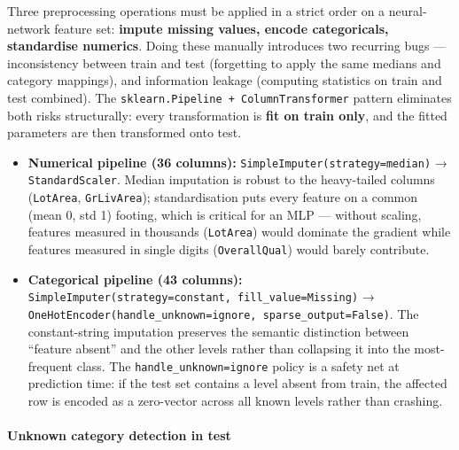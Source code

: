 Three preprocessing operations must be applied in a strict order on a
neural-network feature set: \textbf{impute missing values, encode
categoricals, standardise numerics}. Doing these manually introduces two
recurring bugs --- inconsistency between train and test (forgetting to
apply the same medians and category mappings), and information leakage
(computing statistics on train and test combined). The
\texttt{sklearn.Pipeline\ +\ ColumnTransformer} pattern eliminates both
risks structurally: every transformation is \textbf{fit on train only},
and the fitted parameters are then transformed onto test.

\begin{itemize}
\tightlist
\item
  \textbf{Numerical pipeline (36 columns):}
  \texttt{SimpleImputer(strategy=\textquotesingle{}median\textquotesingle{})}
  → \texttt{StandardScaler}. Median imputation is robust to the
  heavy-tailed columns (\texttt{LotArea}, \texttt{GrLivArea});
  standardisation puts every feature on a common (mean 0, std 1)
  footing, which is critical for an MLP --- without scaling, features
  measured in thousands (\texttt{LotArea}) would dominate the gradient
  while features measured in single digits (\texttt{OverallQual}) would
  barely contribute.
\item
  \textbf{Categorical pipeline (43 columns):}
  \texttt{SimpleImputer(strategy=\textquotesingle{}constant\textquotesingle{},\ fill\_value=\textquotesingle{}Missing\textquotesingle{})}
  →
  \texttt{OneHotEncoder(handle\_unknown=\textquotesingle{}ignore\textquotesingle{},\ sparse\_output=False)}.
  The constant-string imputation preserves the semantic distinction
  between ``feature absent'' and the other levels rather than collapsing
  it into the most-frequent class. The
  \texttt{handle\_unknown=\textquotesingle{}ignore\textquotesingle{}}
  policy is a safety net at prediction time: if the test set contains a
  level absent from train, the affected row is encoded as a zero-vector
  across all known levels rather than crashing.
\end{itemize}

\paragraph{Unknown category detection in
test}\label{unknown-category-detection-in-test}

